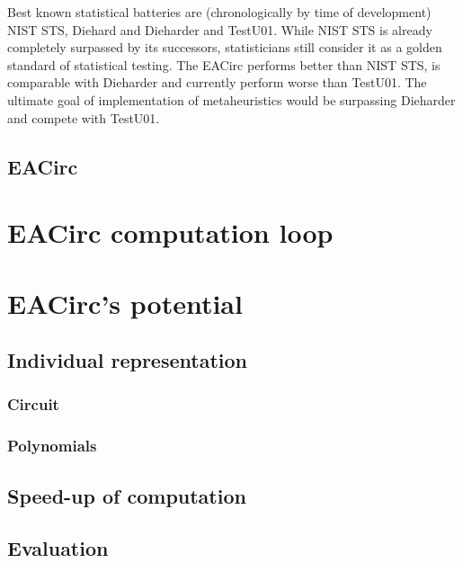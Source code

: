 \documentclass[
  print, %
  Table,   %
  nolof,     %
  nolot,     %
  11pt, %
  oneside  %
]{fithesis3}
\begin{document}
Best known statistical batteries are (chronologically by time of development) NIST STS, Diehard and Dieharder and TestU01. While NIST STS is already completely surpassed by its successors, statisticians still consider it as a golden standard of statistical testing. The EACirc performs better than NIST STS, is comparable with Dieharder and currently perform worse than TestU01. The ultimate goal of implementation of metaheuristics would be surpassing Dieharder and compete with TestU01.

\subsection{EACirc}
\label{subsec:eacirc}

\section{EACirc computation loop}
\label{sec:eac-comp}

\section{EACirc's potential}
\label{sec:eac-potential}

\subsection{Individual representation}
\label{subsec:eac-indiv-repres}

\subsubsection{Circuit}
\label{subsubsec:eac-indiv-repres-circuit}

\subsubsection{Polynomials}
\label{subsubsec:eac-indiv-repres-poly}

\subsection{Speed-up of computation}
\label{subsec:eac-speedup}

\subsection{Evaluation}
\label{subsec:eac-eval}
\end{document}
